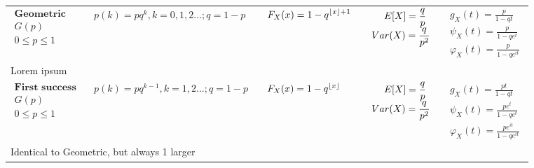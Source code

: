 \documentclass{article}
\DeclarePairedDelimiter\floor{\lfloor}{\rfloor}
\begin{document}
\begin{landscape}
\begin{table}[ht]
\begin{tabular}{@{}l p{6.0cm} p{5cm} p{3.0cm} r@{}}
    
        $\begin{array}{l}
                \textbf{Geometric} \\
                G(p) \\
                0 \leq p \leq 1
        \end{array}$ & 
        $\begin{array}{l}
        \displaystyle p(k) = p q^{k}, k = 0,1,2... ; q = 1-p\\
        \end{array}$ & 
        $\begin{array}{l}
            \displaystyle F_X(x) = 1 - q^{\floor{x} + 1}
        \end{array}$ & 
        $\begin{array}{l}
        \displaystyle \hspace{0.45cm}  E[X] = \frac{q}{p} \\
        \displaystyle Var(X) = \frac{q}{p^2}
        \end{array}$ & 
        $\begin{array}{r}
        \displaystyle g_X(t) = \frac{p}{1-qt} \\
        \displaystyle \psi_X(t) = \frac{p}{1-qe^{t}} \\
        \displaystyle \varphi_X(t) = \frac{p}{1-qe^{it}}
        \end{array}$ \\
        \multicolumn{4}{p{19cm}}{Lorem ipsum} \\
        
        $\begin{array}{l}
            \textbf{First success} \\
            G(p) \\
            0 \leq p \leq 1
    \end{array}$ & 
    $\begin{array}{l}
    \displaystyle p(k) = p q^{k-1}, k = 1,2... ; q = 1-p\\
    \end{array}$ & 
    $\begin{array}{l}
        \displaystyle F_X(x) = 1 - q^{\floor{x}}
    \end{array}$ & 
    $\begin{array}{l}
    \displaystyle \hspace{0.45cm}  E[X] = \frac{q}{p} \\
    \displaystyle Var(X) = \frac{q}{p^2}
    \end{array}$ & 
    $\begin{array}{r}
    \displaystyle g_X(t) = \frac{pt}{1-qt} \\
    \displaystyle \psi_X(t) = \frac{pe^{t}}{1-qe^{t}} \\
    \displaystyle \varphi_X(t) = \frac{pe^{it}}{1-qe^{it}}
    \end{array}$ \\
    \multicolumn{4}{p{19cm}}{Identical to Geometric, but always 1 larger} \\
        

\end{tabular}
\end{table}
\end{landscape}
\end{document}
